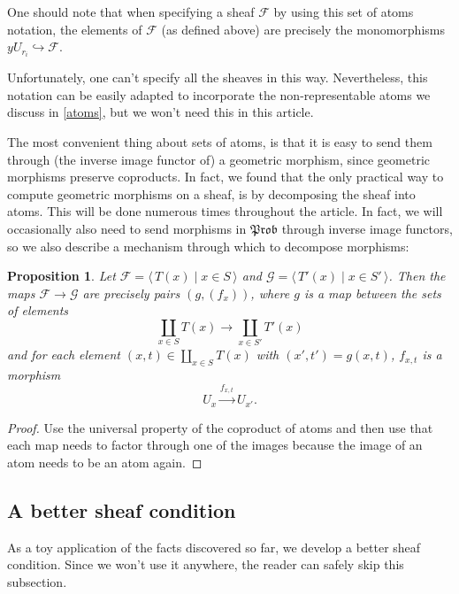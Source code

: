 \documentclass[a4paper]{amsproc}
\theoremstyle{plain}
\newtheorem{proposition}[theorem]{Proposition}
\theoremstyle{definition}
\theoremstyle{remark}
\numberwithin{equation}{section}
\newcommand{\y}{\textit{y}}
\newcommand{\Prob}{\mathfrak{Prob}}
\newcommand{\la}{\langle\,}
\newcommand{\ra}{\,\rangle}
\begin{document}
One should note that when specifying a sheaf $\mathcal{F}$ by using this set of atoms notation, the elements of $\mathcal{F}$ (as defined above) are precisely the monomorphisms $\y U_{r_i} \hookrightarrow \mathcal{F}$.

Unfortunately, one can't specify all the sheaves in this way. Nevertheless, this notation can be easily adapted to incorporate the non-representable atoms we discuss in \ref{atoms}, but we won't need this in this article.

The most convenient thing about sets of atoms, is that it is easy to send them through (the inverse image functor of) a geometric morphism, since geometric morphisms preserve coproducts. In fact, we found that the only practical way to compute geometric morphisms on a sheaf, is by decomposing the sheaf into atoms. This will be done numerous times throughout the article. In fact, we will occasionally also need to send morphisms in $\Prob$ through inverse image functors, so we also describe a mechanism through which to decompose morphisms:

\begin{proposition}\label{atom_coprod_maps}
    Let $\mathcal{F} = \la T(x) \mid x \in S \ra$ and $\mathcal{G} = \la T'(x) \mid x \in S' \ra $. Then the maps $\mathcal{F} \to \mathcal{G}$ are precisely pairs $(g, (f_x))$, where $g$ is a map between the sets of elements
    \[
        \coprod_{x \in S} T(x) \to \coprod_{x \in S'} T'(x)
    \]
    and for each element $(x,t) \in \coprod_{x \in S} T(x)$ with $(x',t') = g(x,t)$, $f_{x,t}$ is a morphism
    \[
        U_x \xrightarrow{f_{x,t}} U_{x'} .
    \]
\end{proposition}
\begin{proof}
    Use the universal property of the coproduct of atoms and then use that each map needs to factor through one of the images because the image of an atom needs to be an atom again.
\end{proof}

\subsection{A better sheaf condition}

As a toy application of the facts discovered so far, we develop a better sheaf condition. Since we won't use it anywhere, the reader can safely skip this subsection.
\end{document}

